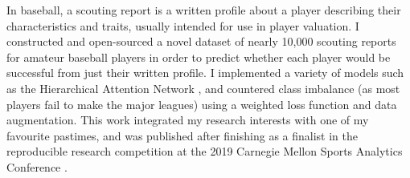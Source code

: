 
In baseball, a scouting report is a written profile about a player describing their characteristics and traits, usually intended for use in player valuation. I constructed and open-sourced a novel dataset of nearly 10,000 scouting reports for amateur baseball players in order to predict whether each player would be successful from just their written profile. I implemented a variety of models such as the Hierarchical Attention Network \cite{Yang2016HierarchicalAN}, and countered class imbalance (as most players fail to make the major leagues) using a weighted loss function and data augmentation. This work integrated my research interests with one of my favourite pastimes, and was published after finishing as a finalist in the reproducible research competition at the 2019 Carnegie Mellon Sports Analytics Conference \cite{danovitch2019trouble}.